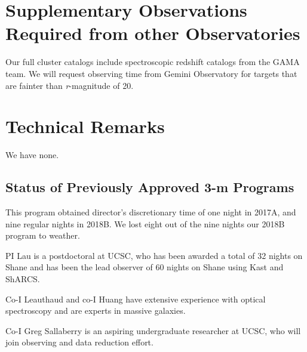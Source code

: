 \documentclass[letterpaper,12pt]{article}
\begin{document}
\section{Supplementary Observations Required from other Observatories}

Our full cluster catalogs include spectroscopic redshift catalogs from the GAMA team. We will 
request observing time from Gemini Observatory for targets that are fainter than 
{\it r}-magnitude of 20. 

\section{Technical Remarks}

We have none. 

\subsection{Status of Previously Approved 3-m Programs}

This program obtained director's discretionary time of one night in 2017A, and nine regular 
nights in 2018B. We lost eight out of the nine nights our 2018B program to weather. 

PI Lau is a postdoctoral at UCSC, who has been awarded a total of 32 nights on Shane and has 
been the lead observer of 60 nights on Shane using Kast and ShARCS. 

Co-I Leauthaud and co-I Huang have extensive experience with optical spectroscopy and are experts 
in massive galaxies. 

Co-I Greg Sallaberry is an aspiring undergraduate researcher at UCSC, who will join observing 
and data reduction effort. 
\end{document}
